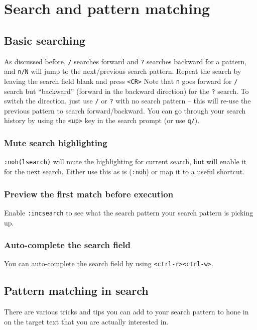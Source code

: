 \chapter{Search and pattern matching}

\section{Basic searching}

As discussed before, \verb|/| searches forward and \verb|?| searches backward for a pattern, and \verb|n/N| will jump to the next/previous search pattern.
Repeat the search by leaving the search field blank and press \verb|<CR>|
Note that \verb|n| goes forward for \verb|/| search but ``backward'' (forward in the backward direction) for the \verb|?| search.
To switch the direction, just use \verb|/| or \verb|?| with no search pattern -- this will re-use the previous pattern to search forward/backward.
You can go through your search history by using the \verb|<up>| key in the search prompt (or use \verb|q/|).

\subsection{Mute search highlighting}

\verb|:noh(lsearch)| will mute the highlighting for current search, but will enable it for the next search.
Either use this as is (\verb|:noh|) or map it to a useful shortcut.

\subsection{Preview the first match before execution}

Enable \verb|:incsearch| to see what the search pattern your search pattern is picking up.

\subsection{Auto-complete the search field}

You can auto-complete the search field by using \verb|<ctrl-r><ctrl-w>|.

\section{Pattern matching in search}

There are various tricks and tips you can add to your search pattern to hone in  on the target text that you are actually interested in.

